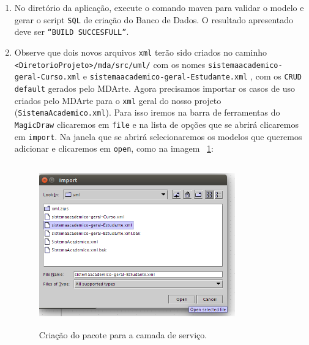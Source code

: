 \begin{enumerate}
\item No diretório da aplicação, execute o comando maven para validar o modelo e
gerar o script \texttt{SQL} de criação do Banco de Dados. O resultado
apresentado deve ser \texttt{“BUILD SUCCESFULL”}.
	
\item Observe que dois novos arquivos \texttt{xml} terão sido criados no caminho
\texttt{<DiretorioProjeto>/mda/src/uml/} com os nomes
\texttt{sistemaacademico-geral-Curso.xml} e
\texttt{sistemaacademico-geral-Estudante.xml} , com os
\texttt{CRUD} \texttt{default} gerados pelo MDArte. Agora precisamos importar os
casos de uso criados pelo MDArte para o \texttt{xml} geral do nosso projeto
(\texttt{SistemaAcademico.xml}). Para isso iremos na barra de ferramentas do
\texttt{MagicDraw} clicaremos em \texttt{file} e na lista de opções que se
abrirá clicaremos em \texttt{import}. Na janela que se abrirá selecionaremos os
modelos que queremos adicionar e clicaremos em \texttt{open}, como na imagem
~\ref{importa_modulo_geral}:
 \begin{figure}[H]
	\centering
	\includegraphics[width=240pt,height=200pt]{imgs/tutorial-mdarte-0016.png}
	\caption{Criação do pacote para a camada de serviço.}
	\label{importa_modulo_geral}
\end{figure} 


\end{enumerate}
